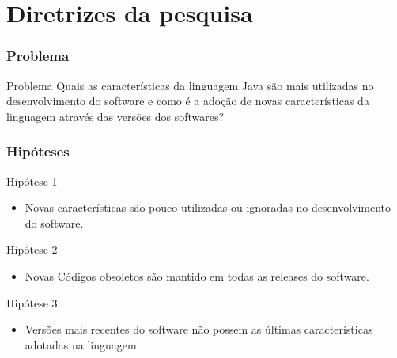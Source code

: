 \documentclass[]{beamer}
\begin{document}



	\section{Diretrizes da pesquisa}

	\begin{frame}[fragile]\frametitle{Problema}
		\begin{block}{Problema}
			Quais as características da linguagem Java são mais utilizadas no desenvolvimento do software e como é a adoção de novas características da linguagem através das versões dos softwares?
		\end{block}
	\end{frame}	
	
	
	\begin{frame}[fragile]\frametitle{Hipóteses}
		
		\begin{block}{Hipótese 1}
			\begin{itemize}
				\item Novas características são pouco utilizadas ou ignoradas no desenvolvimento do software.
			\end{itemize}
		
		\end{block}
		
		\begin{block}{Hipótese 2}
			\begin{itemize}
				\item Novas Códigos obsoletos são mantido em todas as releases do software.
			\end{itemize}
		\end{block}
		
		\begin{block}{Hipótese 3}
			\begin{itemize}
				\item Versões mais recentes do software não possem as últimas características adotadas na linguagem.
			\end{itemize}
		\end{block}
		
	\end{frame}
	
\end{document}
